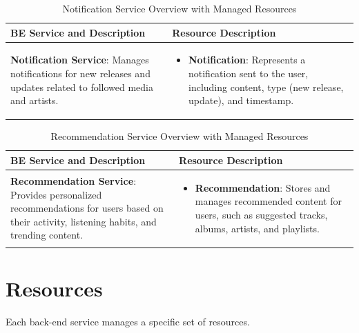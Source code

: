 \documentclass[a4paper,12pt]{article}
\begin{document}
\begin{table}[H]
    \centering
    \renewcommand{\arraystretch}{1.5}
    \begin{tabular}{|>{\centering\arraybackslash}m{4cm}|m{10cm}|}
    \hline
    \textbf{BE Service and Description} & \textbf{Resource Description} \\
    \hline
    \textbf{Notification Service}: Manages notifications for new releases and updates related to followed media and artists. &
    \begin{itemize}[left=0pt]
        \item \textbf{Notification}: Represents a notification sent to the user, including content, type (new release, update), and timestamp.
    \end{itemize} \\
    \hline
    \end{tabular}
    \caption{Notification Service Overview with Managed Resources}
\end{table}

\begin{table}[H]
    \centering
    \renewcommand{\arraystretch}{1.5}
    \begin{tabular}{|>{\centering\arraybackslash}m{4cm}|m{10cm}|}
    \hline
    \textbf{BE Service and Description} & \textbf{Resource Description} \\
    \hline
    \textbf{Recommendation Service}: Provides personalized recommendations for users based on their activity, listening habits, and trending content. &
    \begin{itemize}[left=0pt]
        \item \textbf{Recommendation}: Stores and manages recommended content for users, such as suggested tracks, albums, artists, and playlists.
    \end{itemize} \\
    \hline
    \end{tabular}
    \caption{Recommendation Service Overview with Managed Resources}
\end{table}

 \clearpage

\section{Resources}
Each back-end service manages a specific set of resources. 
\end{document}
